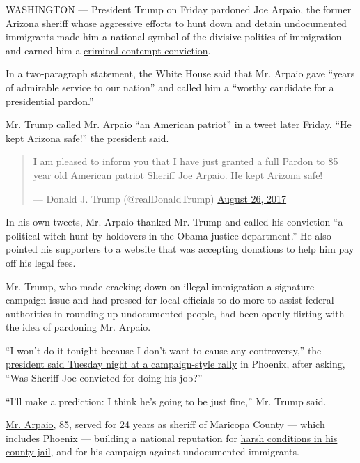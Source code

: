 WASHINGTON --- President Trump on Friday pardoned Joe Arpaio, the former
Arizona sheriff whose aggressive efforts to hunt down and detain
undocumented immigrants made him a national symbol of the divisive
politics of immigration and earned him a
\href{https://www.nytimes.com/2017/07/31/us/sheriff-joe-arpaio-convicted-arizona.html}{criminal
contempt conviction}.

In a two-paragraph statement, the White House said that Mr. Arpaio gave
``years of admirable service to our nation'' and called him a ``worthy
candidate for a presidential pardon.''

Mr. Trump called Mr. Arpaio ``an American patriot'' in a tweet later
Friday. ``He kept Arizona safe!'' the president said.

\begin{quote}
I am pleased to inform you that I have just granted a full Pardon to 85
year old American patriot Sheriff Joe Arpaio. He kept Arizona safe!

--- Donald J. Trump (@realDonaldTrump)
\href{https://twitter.com/realDonaldTrump/status/901263061511794688?ref_src=twsrc\%5Etfw}{August
26, 2017}
\end{quote}

In his own tweets, Mr. Arpaio thanked Mr. Trump and called his
conviction ``a political witch hunt by holdovers in the Obama justice
department.'' He also pointed his supporters to a website that was
accepting donations to help him pay off his legal fees.

Mr. Trump, who made cracking down on illegal immigration a signature
campaign issue and had pressed for local officials to do more to assist
federal authorities in rounding up undocumented people, had been openly
flirting with the idea of pardoning Mr. Arpaio.

``I won't do it tonight because I don't want to cause any controversy,''
the
\href{https://www.nytimes.com/2017/08/22/us/politics/trump-rally-arizona.html}{president
said Tuesday night at a campaign-style rally} in Phoenix, after asking,
``Was Sheriff Joe convicted for doing his job?''

``I'll make a prediction: I think he's going to be just fine,'' Mr.
Trump said.

\href{https://www.nytimes.com/2017/05/23/us/joe-arpaio-arizona.html}{Mr.
Arpaio}, 85, served for 24 years as sheriff of Maricopa County --- which
includes Phoenix --- building a national reputation for
\href{https://www.nytimes.com/2017/04/04/us/arpaio-tent-city-maricopa-sheriff-penzone.html}{harsh
conditions in his county jail}, and for his campaign against
undocumented immigrants.

